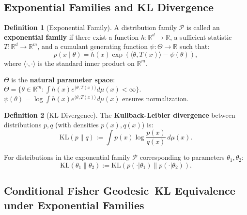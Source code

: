 \documentclass[12pt,a4paper]{article}
\theoremstyle{definition}
\newtheorem{definition}{Definition}[section]
\theoremstyle{remark}
\theoremstyle{definition}
\newcommand{\R}{\mathbb{R}}
\newcommand{\KL}{\mathrm{KL}}
\begin{document}
\subsection{Exponential Families and KL Divergence}

\begin{definition}[Exponential Family]\label{def:exp_fam}
A distribution family $\mathcal{P}$ is called an \textbf{exponential family} if there exist a function $h: \R^d \to \R$, a sufficient statistic $T: \R^d \to \R^m$,
and a cumulant generating function $\psi: \Theta \to \R$ such that:
\[
    p(x \mid \theta) = h(x) \exp\left( \langle \theta, T(x) \rangle - \psi(\theta) \right),
\]
where $\langle \cdot, \cdot \rangle$ is the standard inner product on $\R^m$.

$\Theta$ is the \textbf{natural parameter space}: $\Theta = \{\theta \in \R^m : \int h(x) e^{\langle \theta, T(x) \rangle} d\mu(x) < \infty\}$.
$\psi(\theta) = \log \int h(x) e^{\langle \theta, T(x) \rangle} d\mu(x)$ ensures normalization.
\end{definition}

\begin{definition}[KL Divergence]\label{def:kl}
The \textbf{Kullback-Leibler divergence} between distributions $p, q$ (with densities $p(x), q(x)$) is:
\[
    \KL(p \| q) := \int p(x) \log \frac{p(x)}{q(x)} \, d\mu(x).
\]

For distributions in the exponential family $\mathcal{P}$ corresponding to parameters $\theta_1, \theta_2$:
\[
    \KL(\theta_1 \| \theta_2) := \KL(p(\cdot|\theta_1) \| p(\cdot|\theta_2)).
\]
\end{definition}

\subsection{Conditional Fisher Geodesic--KL Equivalence under Exponential Families}
\end{document}
